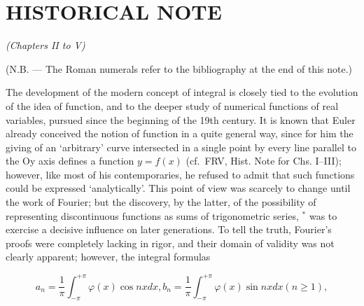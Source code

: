 \chapter*{HISTORICAL NOTE}
{}

\begin{center}
\textit{(Chapters II to V)}
\end{center}

(N.B. --- The Roman numerals refer to the bibliography at the end of this note.)

The development of the modern concept of integral is closely tied to the evolution of the idea of function, and to the deeper study of numerical functions of real variables, pursued since the beginning of the 19th century. It is known that Euler already conceived the notion of function in a quite general way, since for him the giving of an `arbitrary' curve intersected in a single point by every line parallel to the Oy axis defines a function \(y = f(x)\) (cf.~FRV, Hist. Note for Chs. I--III); however, like most of his contemporaries, he refused to admit that such functions could be expressed `analytically'. This point of view was scarcely to change until the work of Fourier; but the discovery, by the latter, of the possibility of representing discontinuous functions as sums of trigonometric series, \(^{*}\) was to exercise a decisive influence on later generations. To tell the truth, Fourier's proofs were completely lacking in rigor, and their domain of validity was not clearly apparent; however, the integral formulas

\[
a _ {n} = \frac {1}{\pi} \int_ {- \pi} ^ {+ \pi} \varphi (x) \cos n x d x, b _ {n} = \frac {1}{\pi} \int_ {- \pi} ^ {+ \pi} \varphi (x) \sin n x d x (n \geqslant 1),\tag{1}
\]

